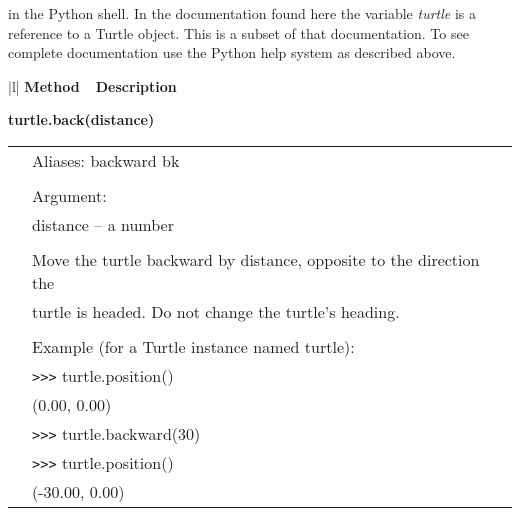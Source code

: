 \noindent in the Python shell. In the documentation found here the variable {\em turtle} is a  reference to a Turtle object. This is a subset of that documentation. To see complete documentation use the Python help system as described above. 


\label{turtlemethods}
\begin{center}
{\small
\begin{tabular}{|l|} \hline
{\bf Method~~Description}  \\ \hline\hline 

{\bf    turtle.back(distance)} \\
   \begin{tabular}{p{0.25in}p{4in}}
&        Aliases:  backward  bk \\
&  \\
&        Argument: \\
&        distance -- a number \\
&  \\
&        Move the turtle backward by distance, opposite to the direction the \\
&        turtle is headed. Do not change the turtle's heading. \\
&  \\
&        Example (for a Turtle instance named turtle): \\
&        \verb+>+\verb+>+\verb+>+ turtle.position() \\
&        (0.00, 0.00) \\
&        \verb+>+\verb+>+\verb+>+ turtle.backward(30) \\
&        \verb+>+\verb+>+\verb+>+ turtle.position() \\
&        (-30.00, 0.00) \\
\end{tabular} \\ \hline


\end{tabular}}
\end{center}
